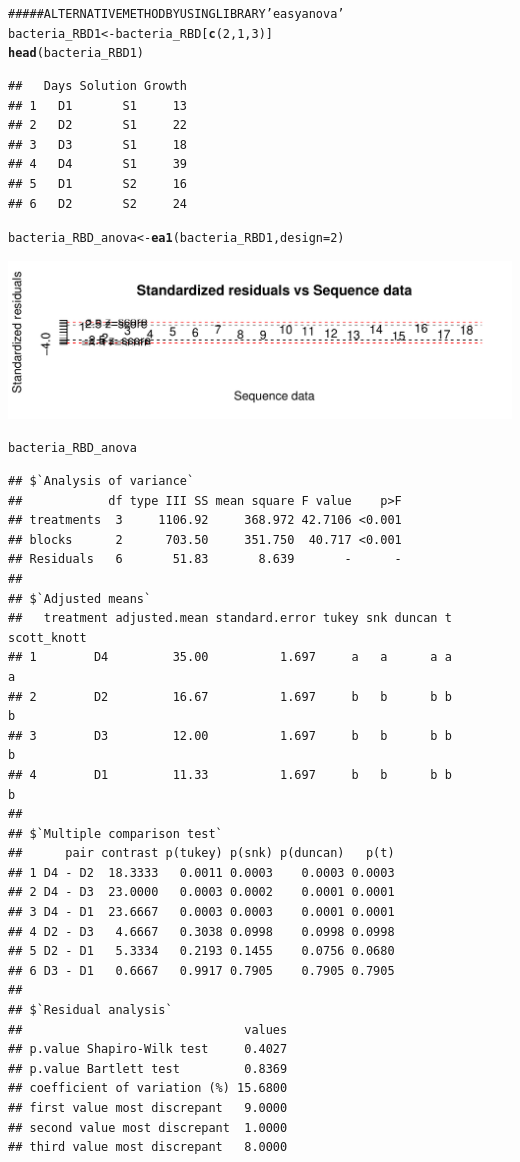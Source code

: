 \documentclass[a4paper]{article}\usepackage{graphicx, color}
\makeatletter
\def\maxwidth{ %
  \ifdim\Gin@nat@width>\linewidth
    \linewidth
  \else
    \Gin@nat@width
  \fi
}
\newcommand{\hlfunctioncall}[1]{\textcolor[rgb]{0.501960784313725,0,0.329411764705882}{\textbf{#1}}}%
\newcommand{\hlcomment}[1]{\textcolor[rgb]{0.180392156862745,0.6,0.341176470588235}{#1}}%
\newenvironment{kframe}{%
 \def\at@end@of@kframe{}%
 \ifinner\ifhmode%
  \def\at@end@of@kframe{\end{minipage}}%
  \begin{minipage}{\columnwidth}%
 \fi\fi%
 \def\FrameCommand##1{\hskip\@totalleftmargin \hskip-\fboxsep
 \colorbox{shadecolor}{##1}\hskip-\fboxsep
     \hskip-\linewidth \hskip-\@totalleftmargin \hskip\columnwidth}%
 \MakeFramed {\advance\hsize-\width
   \@totalleftmargin\z@ \linewidth\hsize
   \@setminipage}}%
 {\par\unskip\endMakeFramed%
 \at@end@of@kframe}
\newenvironment{knitrout}{}{} %
\makeatother
\begin{document}
\begin{knitrout}
\begin{kframe}
\begin{alltt}
\hlcomment{##### ALTERNATIVE METHOD BY USING LIBRARY 'easyanova'}
bacteria_RBD1 <- bacteria_RBD[\hlfunctioncall{c}(2, 1, 3)]
\hlfunctioncall{head}(bacteria_RBD1)
\end{alltt}
\begin{verbatim}
##   Days Solution Growth
## 1   D1       S1     13
## 2   D2       S1     22
## 3   D3       S1     18
## 4   D4       S1     39
## 5   D1       S2     16
## 6   D2       S2     24
\end{verbatim}
\begin{alltt}
bacteria_RBD_anova <- \hlfunctioncall{ea1}(bacteria_RBD1, design = 2)
\end{alltt}
\end{kframe}
\includegraphics[width=\maxwidth]{figure/unnamed-chunk-9} 
\begin{kframe}\begin{alltt}
bacteria_RBD_anova
\end{alltt}
\begin{verbatim}
## $`Analysis of variance`
##            df type III SS mean square F value    p>F
## treatments  3     1106.92     368.972 42.7106 <0.001
## blocks      2      703.50     351.750  40.717 <0.001
## Residuals   6       51.83       8.639       -      -
## 
## $`Adjusted means`
##   treatment adjusted.mean standard.error tukey snk duncan t scott_knott
## 1        D4         35.00          1.697     a   a      a a           a
## 2        D2         16.67          1.697     b   b      b b           b
## 3        D3         12.00          1.697     b   b      b b           b
## 4        D1         11.33          1.697     b   b      b b           b
## 
## $`Multiple comparison test`
##      pair contrast p(tukey) p(snk) p(duncan)   p(t)
## 1 D4 - D2  18.3333   0.0011 0.0003    0.0003 0.0003
## 2 D4 - D3  23.0000   0.0003 0.0002    0.0001 0.0001
## 3 D4 - D1  23.6667   0.0003 0.0003    0.0001 0.0001
## 4 D2 - D3   4.6667   0.3038 0.0998    0.0998 0.0998
## 5 D2 - D1   5.3334   0.2193 0.1455    0.0756 0.0680
## 6 D3 - D1   0.6667   0.9917 0.7905    0.7905 0.7905
## 
## $`Residual analysis`
##                               values
## p.value Shapiro-Wilk test     0.4027
## p.value Bartlett test         0.8369
## coefficient of variation (%) 15.6800
## first value most discrepant   9.0000
## second value most discrepant  1.0000
## third value most discrepant   8.0000
\end{verbatim}
\end{kframe}
\end{knitrout}
\end{document}
